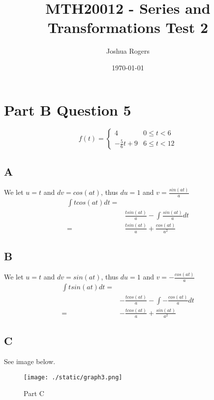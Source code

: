 \documentclass{article}
\title{\vspace{-4cm}MTH20012 - Series and Transformations Test 2}
\author{Joshua Rogers}
\date\today
\begin{document}
\maketitle 

\section*{Part B Question 5}

\[ f(t) = \begin{cases} 
      4 & 0\leq t < 6 \\
      -\frac{5}{6}t+9 & 6\leq t < 12
   \end{cases}
\]

\subsection*{A}

We let $u=t$ and $dv=cos(at)$, thus $du = 1$ and $v = \frac{sin(at)}{a}$
\begin{align*}
\int t cos(at) dt =&\\
&\frac{tsin(at)}{a} - \int \frac{sin(at)}{a} dt\\
= &\frac{tsin(at)}{a} + \frac{cos(at)}{a^2}
\end{align*}

\subsection*{B}

We let $u=t$ and $dv=sin(at)$, thus $du = 1$ and $v = -\frac{cos(at)}{a}$
\begin{align*}
\int t sin(at) dt =&\\
&-\frac{tcos(at)}{a} - \int -\frac{cos(at)}{a} dt\\
= &-\frac{tcos(at)}{a} + \frac{sin(at)}{a^2}
\end{align*}

\subsection*{C}
See image below.
\begin{figure}
\centering
\texttt{[image: ./static/graph3.png]}
\caption{Part C}
\end{figure}
\end{document}
